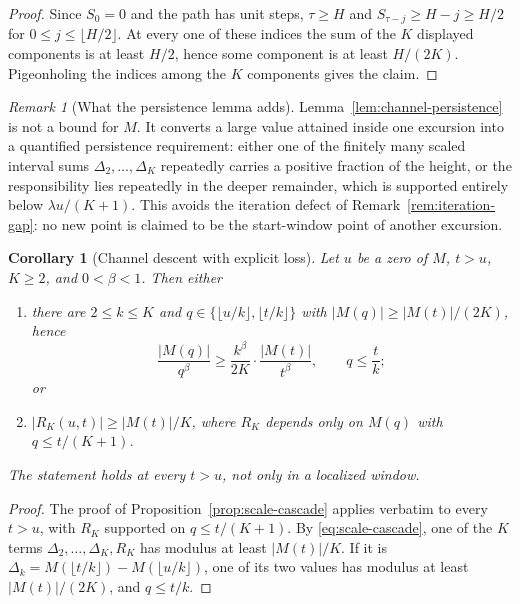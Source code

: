 \documentclass[11pt]{amsart}
\numberwithin{equation}{section}
\theoremstyle{plain}
\newtheorem{corollary}[theorem]{Corollary}
\theoremstyle{definition}
\theoremstyle{remark}
\newtheorem{remark}[theorem]{Remark}
\begin{document}
\begin{proof}
Since $S_0=0$ and the path has unit steps, $\tau\ge H$ and
$S_{\tau-j}\ge H-j\ge H/2$ for
$0\le j\le\lfloor H/2\rfloor$.  At every one of these indices the sum of
the $K$ displayed components is at least $H/2$, hence some component is at
least $H/(2K)$.  Pigeonholing the indices among the $K$ components gives the
claim.
\end{proof}

\begin{remark}[What the persistence lemma adds]
\label{rem:persistence-content}
Lemma~\ref{lem:channel-persistence} is not a bound for $M$.  It converts a
large value attained inside one excursion into a quantified persistence
requirement: either one of the finitely many scaled interval sums
$\Delta_2,\ldots,\Delta_K$ repeatedly carries a positive fraction of the
height, or the responsibility lies repeatedly in the deeper remainder,
which is supported entirely below $\lambda u/(K+1)$.  This avoids the
iteration defect of Remark~\ref{rem:iteration-gap}: no new point is claimed
to be the start-window point of another excursion.
\end{remark}
\begin{corollary}[Channel descent with explicit loss]
\label{cor:channel-descent}
Let $u$ be a zero of $M$, $t>u$, $K\ge2$, and $0<\beta<1$. Then either
\begin{enumerate}[label=\textup{(\roman*)}]
\item there are $2\le k\le K$ and $q\in\{\lfloor u/k\rfloor,\lfloor t/k\rfloor\}$
with $|M(q)|\ge|M(t)|/(2K)$, hence
\[
\frac{|M(q)|}{q^\beta}\ge\frac{k^\beta}{2K}\cdot\frac{|M(t)|}{t^\beta},
\qquad q\le\frac tk;
\]
or
\item $|R_K(u,t)|\ge|M(t)|/K$, where $R_K$ depends only on
$M(q)$ with $q\le t/(K+1)$.
\end{enumerate}
The statement holds at every $t>u$, not only in a localized window.
\end{corollary}

\begin{proof}
The proof of Proposition~\ref{prop:scale-cascade} applies verbatim to every
$t>u$, with $R_K$ supported on $q\le t/(K+1)$. By \eqref{eq:scale-cascade}, one of the $K$ terms
$\Delta_2,\dots,\Delta_K,R_K$ has modulus at least $|M(t)|/K$. If it is
$\Delta_k=M(\lfloor t/k\rfloor)-M(\lfloor u/k\rfloor)$, one of its two values
has modulus at least $|M(t)|/(2K)$, and $q\le t/k$.
\end{proof}
\end{document}
